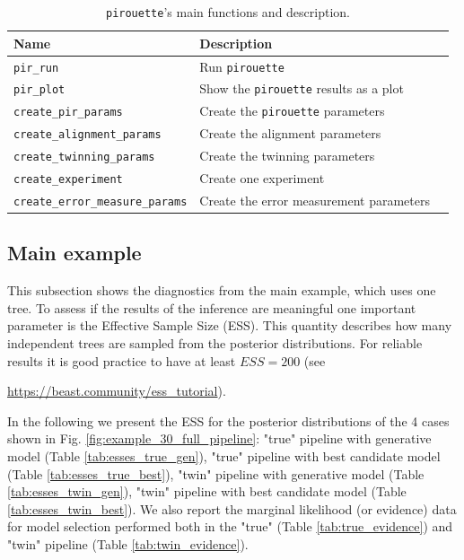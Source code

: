 \begin{table}[h]
  \centering
  \begin{tabular}{ | l | l | l | }
    \hline
    \textbf{Name} & \textbf{Description} \\
    \hline
    \verb;pir_run; & Run \verb;pirouette; \\
    \verb;pir_plot; & Show the \verb;pirouette; results as a plot  \\
    \verb;create_pir_params; & Create the \verb;pirouette; parameters  \\
    \hline
    \verb;create_alignment_params; & Create the alignment parameters  \\
    \verb;create_twinning_params; & Create the twinning parameters  \\
    \verb;create_experiment; & Create one experiment  \\
    \verb;create_error_measure_params; & Create the error measurement parameters  \\
    \hline
  \end{tabular}
  \caption{
    \texttt{pirouette}'s main functions and description. 
  }
  \label{tab:functions}
\end{table}

\newpage

\subsection{Main example}
\label{subsec:main_example}

This subsection shows the diagnostics from the main example, which
uses one tree.
To assess if the results of the inference are meaningful one important 
parameter is the Effective Sample Size (ESS). This quantity describes how 
many independent trees are sampled from the posterior distributions. 
For reliable results it is good practice to have at 
least $ESS = 200$ (see 
\begin{sloppypar}
  \url{https://beast.community/ess_tutorial}).
\end{sloppypar}
In the following we present the ESS for the posterior distributions of 
the 4 cases shown in Fig. \ref{fig:example_30_full_pipeline}: 
"true" pipeline with generative model (Table \ref{tab:esses_true_gen}), 
"true" pipeline with best candidate model (Table \ref{tab:esses_true_best}), 
"twin" pipeline with generative model (Table \ref{tab:esses_twin_gen}), 
"twin" pipeline with best candidate model (Table \ref{tab:esses_twin_best}). 
We also report the marginal likelihood (or evidence) data for model selection 
performed both in the "true" (Table \ref{tab:true_evidence}) and 
"twin" pipeline (Table \ref{tab:twin_evidence}).


